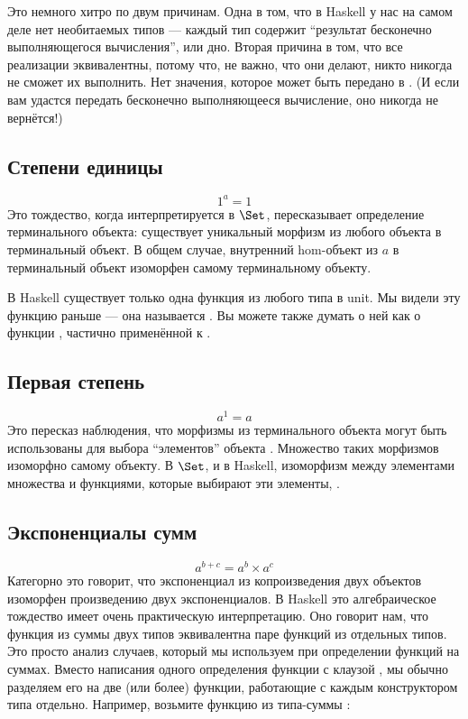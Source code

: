 Это немного хитро по двум причинам. Одна в том, что в Haskell у нас
на самом деле нет необитаемых типов --- каждый тип содержит ``результат
бесконечно выполняющегося вычисления'', или дно. Вторая причина в том,
что все реализации  эквивалентны, потому что, не
важно, что они делают, никто никогда не сможет их выполнить. Нет значения,
которое может быть передано в . (И если вам удастся передать
бесконечно выполняющееся вычисление, оно никогда не вернётся!)

\subsection{Степени единицы}

\[1^{a} = 1\]
Это тождество, когда интерпретируется в $\Set$, пересказывает определение
терминального объекта: существует уникальный морфизм из любого объекта в
терминальный объект. В общем случае, внутренний hom-объект из $a$
в терминальный объект изоморфен самому терминальному объекту.

В Haskell существует только одна функция из любого типа  в unit.
Мы видели эту функцию раньше --- она называется . Вы можете
также думать о ней как о функции , частично применённой к
\code{()}.

\subsection{Первая степень}

\[a^{1} = a\]
Это пересказ наблюдения, что морфизмы из
терминального объекта могут быть использованы для выбора ``элементов'' объекта
. Множество таких морфизмов изоморфно самому объекту.
В $\Set$, и в Haskell, изоморфизм между
элементами множества  и функциями, которые выбирают эти элементы,
.

\subsection{Экспоненциалы сумм}

\[a^{b+c} = a^{b} \times a^{c}\]
Категорно это говорит, что экспоненциал из копроизведения двух
объектов изоморфен произведению двух экспоненциалов. В Haskell это
алгебраическое тождество имеет очень практическую интерпретацию. Оно говорит нам,
что функция из суммы двух типов эквивалентна паре
функций из отдельных типов. Это просто анализ случаев, который мы
используем при определении функций на суммах. Вместо написания одного определения функции
с клаузой , мы обычно разделяем его на две
(или более) функции, работающие с каждым конструктором типа отдельно. Например,
возьмите функцию из типа-суммы
:

